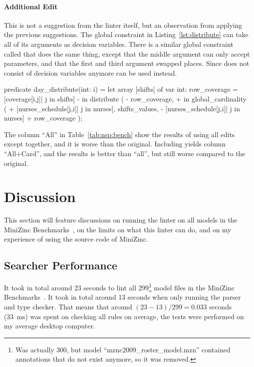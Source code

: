 \documentclass[a4paper,12pt]{article}
\begin{document}
\paragraph{Additional Edit}
\begin{sloppypar}
This is not a suggestion from the linter itself, but an
observation from applying the previous suggestions.
The global constraint  in Listing~\ref{lst:distribute} can take all of its
arguments as decision variables. There is a similar global constraint called
 that does the same thing, except that the middle argument can
only accept parameters, and that the first and third argument swapped places. Since
 does not consist of decision variables anymore can
 be used instead.
\end{sloppypar}
\begin{mznnobreak}[style=diff]
predicate day_distribute(int: i) = let {
  array [shifts] of var int: row_coverage =
    [coverage[i,j]| j in shifts]
  }
- in distribute (
-   row_coverage,
+ in global_cardinality (
+   [nurses_schedule[j,i]| j in nurses],
    shifts_values,
-   [nurses_schedule[j,i]| j in nurses]
+   row_coverage
    );
\end{mznnobreak}
\begin{sloppypar}
The column ``All'' in Table~\ref{tab:nsp:bench} show the results of using all edits except
 together, and it is worse than the original. Including
 yields column ``All+Card'', and the results is better than
``all'', but still worse compared to the original.
\end{sloppypar}

\section{Discussion}\label{sec:discussion}
This section will feature discussions on running the linter on all models in the MiniZinc
Benchmarks~\cite{mznbench}, on the limits on what this linter can do, and on my experience
of using the source code of MiniZinc.

\subsection{Searcher Performance}\label{sec:discussion:searcher}
It took in total around 23 seconds to lint all 299\footnote{Was actually 300, but model
  ``mznc2009\_roster\_model.mzn'' contained annotations that do not exist anymore, so it was
  removed.} model
files in the MiniZinc Benchmarks~\cite{mznbench}. It took in total around 13 seconds when
only running the parser and type checker. That means that around $(23-13)/299 = 0.033$
seconds (\SI{33}{\milli\second}) was spent on checking all rules on average, the tests
were performed on my average desktop computer.
\end{document}
